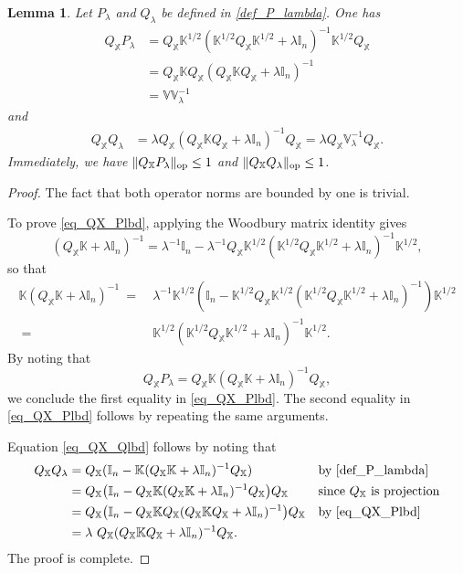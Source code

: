 \documentclass[11pt,twoside]{article}
\newtheorem{lemma}{Lemma}
\def\VV{\mathbb{V}}
\def\KK{\mathbb{K}}
\def\II{\mathbb{I}}
\def\XX{\mathbb{X}}
\def\op{{\rm op}}
\def\l{\left}
\def\r{\right}
\def\b{\big}
\begin{document}
\begin{lemma}\label{lem_rem_Q_PQ_lbd}
    Let  $P_\lambda$ and $Q_{\lambda}$ be defined in \eqref{def_P_lambda}. One has 
    \begin{equation}\label{eq_QX_Plbd}
        \begin{aligned}
             Q_{\XX} P_\lambda &= Q_{\XX} \KK^{1/2} (\KK^{1/2} Q_{\XX} \KK^{1/2} +\lambda \II_n )^{-1}\KK^{1/2}Q_{\XX}\\
            &= Q_{\XX} \KK Q_{\XX}  (Q_{\XX} \KK Q_{\XX}+\lambda \II_n )^{-1}\\
            &= \VV \VV_\lambda^{-1}
        \end{aligned}
    \end{equation}
    and 
    \begin{align} \label{eq_QX_Qlbd}
        Q_{\XX} Q_{\lambda} &= \lambda  Q_{\XX}   (  Q_{\XX}  \KK Q_{\XX}  +\lambda \II_n)^{-1}   Q_{\XX} = \lambda Q_{\XX}  \VV_\lambda^{-1} Q_{\XX}.
    \end{align}
    Immediately, we have $\| Q_{\XX} P_\lambda \|_\op\le 1 $ and $\| Q_{\XX} Q_{\lambda} \|_\op\le 1$.
\end{lemma} 
\begin{proof} 
The fact that both operator norms are bounded by one is trivial. 

To prove \eqref{eq_QX_Plbd}, applying the  Woodbury matrix identity gives
\[
( Q_{\XX} \KK +\lambda \II_n )^{-1}=\lambda^{-1}\II_n -\lambda^{-1} Q_{\XX}\KK^{1/2}(\KK^{1/2} Q_{\XX} \KK^{1/2} +\lambda \II_n )^{-1}\KK^{1/2},
\]
so that
\begin{align*}
   \KK ( Q_{\XX} \KK +\lambda \II_n )^{-1} ~=~&\lambda^{-1}\KK^{1/2}\l(\II_n - \KK^{1/2} Q_{\XX}\KK^{1/2}(\KK^{1/2} Q_{\XX}\KK^{1/2} +\lambda \II_n )^{-1}\r)\KK^{1/2}\\
  ~=~ &\KK^{1/2} (\KK^{1/2} Q_{\XX} \KK^{1/2} +\lambda \II_n )^{-1}\KK^{1/2}.
\end{align*}
By noting that
\[
  Q_{\XX} P_\lambda =   Q_{\XX} \KK ( Q_{\XX} \KK +\lambda \II_n )^{-1} Q_{\XX},
\]
we conclude the first equality in \eqref{eq_QX_Plbd}.
The second equality in \eqref{eq_QX_Plbd} follows by repeating the same arguments.

Equation \eqref{eq_QX_Qlbd} follows by noting that
    \begin{align*}
    Q_{\XX}   Q_{\lambda} 
    & = Q_{\XX}  ( \II_n -   \KK  (  Q_{\XX}  \KK +\lambda \II_n)^{-1}  Q_{\XX}  ) &&\text{by \eqref{def_P_lambda}}\\
  &  = Q_{\XX}  \b( \II_n - Q_{\XX}  \KK  (  Q_{\XX}  \KK +\lambda \II_n)^{-1}  Q_{\XX}  \b)Q_{\XX} &&\text{since $Q_{\XX} $ is projection}\\
    &  = Q_{\XX}  \b(\II_n - Q_{\XX}  \KK  Q_{\XX}   ( Q_{\XX}  \KK  Q_{\XX}   + \lambda \II_n)^{-1}  \b) Q_{\XX}  &&\text{by \eqref{eq_QX_Plbd}} \\
   & =\lambda ~ Q_{\XX}   (  Q_{\XX}  \KK Q_{\XX}  +\lambda \II_n)^{-1}   Q_{\XX}.
\end{align*}  
The proof is complete.
\end{proof}
 
\end{document}
